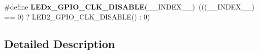 \begin{DoxyCompactItemize}
\item 
\mbox{\label{group___s_t_m32_f0_x_x___n_u_c_l_e_o___l_e_d_gaced1ef8f2a770d8c516ebc499b291df1}} 
\#define {\bfseries L\+E\+Dx\+\_\+\+G\+P\+I\+O\+\_\+\+C\+L\+K\+\_\+\+D\+I\+S\+A\+B\+LE}(\+\_\+\+\_\+\+I\+N\+D\+E\+X\+\_\+\+\_\+)~(((\+\_\+\+\_\+\+I\+N\+D\+E\+X\+\_\+\+\_\+) == 0) ? L\+E\+D2\+\_\+\+G\+P\+I\+O\+\_\+\+C\+L\+K\+\_\+\+D\+I\+S\+A\+B\+LE() \+: 0)
\end{DoxyCompactItemize}


\subsection{Detailed Description}
